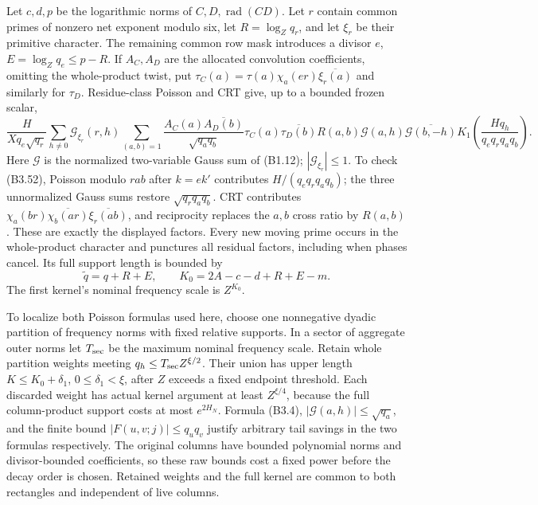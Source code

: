 \documentclass[11pt,a4paper]{article}
\begin{document}
Let \(c,\allowbreak{}d,\allowbreak{}p\) be the logarithmic norms of
\(C,\allowbreak{}D,\allowbreak{}\operatorname{rad}(CD)\). Let \(r\) contain common primes of
nonzero net exponent modulo six, let \(R=\log_Zq_r\), and let \(\xi_r\)
be their primitive character. The remaining common row mask introduces a
divisor \(e\), \(E=\log_Zq_e\le p-R\). If \(A_C,\allowbreak{}A_D\) are the allocated
convolution coefficients, omitting the whole-product twist, put
\(\tau_C(a)=\tau(a)\chi_a(er)\overline{\xi_r(a)}\) and similarly for
\(\tau_D\). Residue-class Poisson and CRT give, up to a bounded frozen
scalar, \[
\frac{H}{Xq_e\sqrt{q_r}}\sum_{h\ne0}\mathcal G_{\xi_r}(r,h)
\sum_{(a,b)=1}\frac{A_C(a)\overline{A_D(b)}}{\sqrt{q_aq_b}}
 \tau_C(a)\overline{\tau_D(b)}R(a,b)
 \mathcal G(a,h)\overline{\mathcal G(b,-h)}
 K_1\!\left(\frac{Hq_h}{q_eq_rq_aq_b}\right).
\tag{B3.52}
\] Here \(\mathcal G\) is the normalized two-variable Gauss sum of
(B1.12); \(|\mathcal G_{\xi_r}|\le1\). To check (B3.52), Poisson modulo
\(rab\) after \(k=ek'\) contributes \(H/(q_eq_rq_aq_b)\); the three
unnormalized Gauss sums restore \(\sqrt{q_rq_aq_b}\). CRT contributes
\(\chi_a(br)\overline{\chi_b(ar)}\overline{\xi_r(ab)}\), and reciprocity
replaces the \(a,\allowbreak{}b\) cross ratio by \(R(a,\allowbreak{}b)\). These are exactly the
displayed factors. Every new moving prime occurs in the whole-product
character and punctures all residual factors, including when phases
cancel. Its full support length is bounded by \[
\widetilde q=q+R+E,\qquad
K_0=2A-c-d+R+E-m.
\tag{B3.53}
\] The first kernel's nominal frequency scale is \(Z^{K_0}\).

To localize both Poisson formulas used here, choose one nonnegative
dyadic partition of frequency norms with fixed relative supports. In a
sector of aggregate outer norms let \(T_{\rm sec}\) be the maximum
nominal frequency scale. Retain whole partition weights meeting
\(q_h\le T_{\rm sec}Z^{\xi/2}\). Their union has upper length
\(K\le K_0+\delta_1\), \(0\le\delta_1<\xi\), after \(Z\) exceeds a fixed
endpoint threshold. Each discarded weight has actual kernel argument at
least \(Z^{\xi/4}\), because the full column-product support costs at
most \(e^{2H_N}\). Formula (B3.4), \(|\mathcal G(a,\allowbreak{}h)|\le\sqrt{q_a}\),
and the finite bound \(|F(u,\allowbreak{}v;j)|\le q_uq_v\) justify arbitrary tail
savings in the two formulas respectively. The original columns have
bounded polynomial norms and divisor-bounded coefficients, so these raw
bounds cost a fixed power before the decay order is chosen. Retained
weights and the full kernel are common to both rectangles and
independent of live columns.
\end{document}

